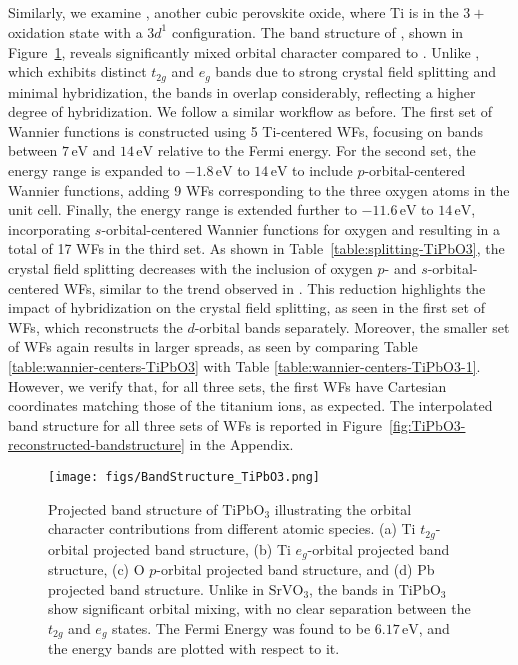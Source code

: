 \documentclass[%
 reprint,
 amsmath,amssymb,
 aps,
]{revtex4-2}
\begin{document}
\subsection{}
Similarly, we examine , another cubic perovskite oxide, where Ti is in the \(3+\) oxidation state with a \(3d^1\) configuration. The band structure of , shown in Figure~\ref{fig:TiPbO3-bandstructure}, reveals significantly mixed orbital character compared to . Unlike , which exhibits distinct \(t_{2g}\) and \(e_g\) bands due to strong crystal field splitting and minimal hybridization, the bands in  overlap considerably, reflecting a higher degree of hybridization.
We follow a similar workflow as before. The first set of Wannier functions is constructed using 5 Ti-centered WFs, focusing on bands between \(7 \, \text{eV}\) and \(14 \, \text{eV}\) relative to the Fermi energy. For the second set, the energy range is expanded to \(-1.8 \, \text{eV}\) to \(14 \, \text{eV}\) to include \(p\)-orbital-centered Wannier functions, adding 9 WFs corresponding to the three oxygen atoms in the unit cell. Finally, the energy range is extended further to \(-11.6 \, \text{eV}\) to \(14 \, \text{eV}\), incorporating \(s\)-orbital-centered Wannier functions for oxygen and resulting in a total of 17 WFs in the third set.
As shown in Table~\ref{table:splitting-TiPbO3}, the crystal field splitting decreases with the inclusion of oxygen \(p\)- and \(s\)-orbital-centered WFs, similar to the trend observed in . This reduction highlights the impact of hybridization on the crystal field splitting, as seen in the first set of WFs, which reconstructs the \(d\)-orbital bands separately. Moreover, the smaller set of WFs again results in larger spreads, as seen by comparing Table \ref{table:wannier-centers-TiPbO3} with Table \ref{table:wannier-centers-TiPbO3-1}. However, we verify that, for all three sets, the first WFs have Cartesian coordinates matching those of the titanium ions, as expected. The interpolated band structure for all three sets of WFs is reported in Figure~\ref{fig:TiPbO3-reconstructed-bandstructure} in the Appendix.
\begin{figure}[htp]
    \centering
    \texttt{[image: figs/BandStructure\_TiPbO3.png]}
\caption{
Projected band structure of \(\text{TiPbO}_3\) illustrating the orbital character contributions from different atomic species. (a) Ti \(t_{2g}\)-orbital projected band structure, (b) Ti \(e_g\)-orbital projected band structure, (c) O \(p\)-orbital projected band structure, and (d) Pb projected band structure. Unlike in \(\text{SrVO}_3\), the bands in \(\text{TiPbO}_3\) show significant orbital mixing, with no clear separation between the \(t_{2g}\) and \(e_g\) states. The Fermi Energy was found to be \(6.17 \, \text{eV}\), and the energy bands are plotted with respect to it. }
\label{fig:TiPbO3-bandstructure}
\end{figure}
\end{document}
